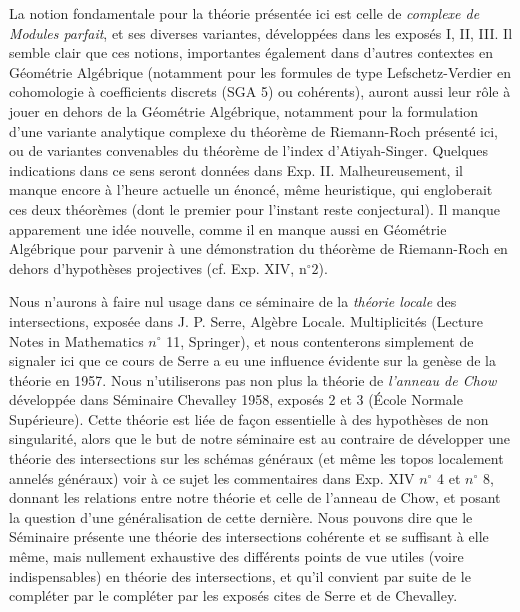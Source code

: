 La notion fondamentale pour la théorie présentée ici est celle de \emph{complexe de Modules parfait}, 
et ses diverses variantes, développées dans les exposés I, II, III. Il semble clair que ces notions, 
importantes également dans d’autres contextes en Géométrie Algébrique (notamment pour les formules de 
type Lefschetz-Verdier en cohomologie à coefficients discrets (SGA 5) ou cohérents), auront aussi leur 
rôle à jouer en dehors de la Géométrie Algébrique, notamment pour la formulation d’une variante analytique 
complexe du théorème de Riemann-Roch présenté ici, ou de variantes convenables du théorème de l’index 
d’Atiyah-Singer. Quelques indications dans ce sens seront données dans Exp. II. Malheureusement, il 
manque encore à l’heure actuelle un énoncé, même heuristique, qui engloberait ces deux théorèmes 
(dont le premier pour l’instant reste conjectural). Il manque apparement une idée nouvelle, comme 
il en manque aussi en Géométrie Algébrique pour parvenir à une démonstration du théorème de Riemann-Roch 
en dehors d’hypothèses projectives (cf. Exp. XIV, n$^\circ 2$).

Nous n’aurons à faire nul usage dans ce séminaire de la \emph{théorie locale} des intersections, exposée 
dans J. P. Serre, Algèbre Locale. Multiplicités (Lecture Notes in Mathematics $n^\circ$ 11, Springer), 
et nous contenterons simplement de signaler ici que ce cours de Serre a eu une influence évidente sur la 
genèse de la théorie en 1957. Nous n’utiliserons pas non plus la théorie de \emph{l’anneau de Chow} 
développée dans Séminaire Chevalley 1958, exposés 2 et 3 (École Normale Supérieure). Cette théorie est 
liée de façon essentielle à des hypothèses de non singularité, alors que le but de notre séminaire est 
au contraire de développer une théorie des intersections sur les schémas généraux (et même les topos 
localement annelés généraux) voir à ce sujet les commentaires dans Exp. XIV $n^\circ$ 4 et $n^\circ$ 8, 
donnant les relations entre notre théorie et celle de l’anneau de Chow, et posant la question d’une 
généralisation de cette dernière. Nous pouvons dire que le Séminaire présente une théorie des intersections 
cohérente et se suffisant à elle même, mais nullement exhaustive des différents points de vue utiles (voire 
indispensables) en théorie des intersections, et qu’il convient par suite de le compléter par le compléter 
par les exposés cites de Serre et de Chevalley.

